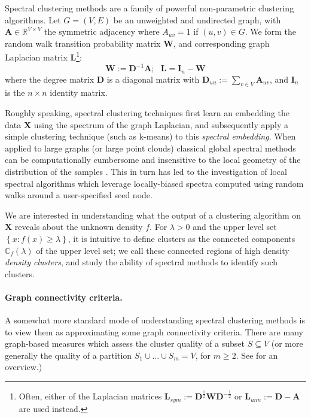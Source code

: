 \documentclass{article}
\newcommand{\set}[1]{\left\{#1\right\}}
\newcommand{\Reals}{\mathbb{R}}
\newcommand{\1}{\mathbf{1}}
\newcommand{\Abf}{\mathbf{A}}
\newcommand{\Xbf}{\mathbf{X}}
\newcommand{\Wbf}{\mathbf{W}}
\newcommand{\Lbf}{\mathbf{L}}
\newcommand{\Dbf}{\mathbf{D}}
\newcommand{\Ibf}[1]{\mathbf{I}_{#1}}
\theoremstyle{aldenthm}
\theoremstyle{aldenrmrk}
\begin{document}
Spectral clustering methods are a family of powerful non-parametric clustering algorithms. Let $G = (V,E)$ be an unweighted and undirected graph, with $\Abf \in \Reals^{V \times V}$ the symmetric adjacency where $A_{uv} = 1$ if $(u,v) \in G$. We form the random walk transition probability matrix $\Wbf$, and corresponding graph Laplacian matrix $\Lbf$\footnote{Often, either of the Laplacian matrices  $\Lbf_{sym} := \Dbf^{\frac{1}{2}}\Wbf \Dbf^{-\frac{1}{2}}$ or $\Lbf_{unn} := \Dbf - \Abf$ are used instead.}:
\begin{equation}
\label{eqn: random_walk_laplacian}
\Wbf := \Dbf^{-1}\Abf; ~~~ \Lbf = \Ibf{n} - \Wbf
\end{equation}
where the degree matrix $\Dbf$ is a diagonal matrix with $\Dbf_{uu} := \sum_{v \in V} \Abf_{uv}$, and $\Ibf{n}$ is the $n \times n$ identity matrix.

Roughly speaking, spectral clustering techniques first learn an embedding the data $\Xbf$ using the spectrum of the graph Laplacian, and subsequently 
apply a simple clustering technique (such as k-means) to this \emph{spectral embedding}.
When applied to large graphs (or large point clouds) classical global spectral 
methods can be computationally cumbersome and 
insensitive to the local geometry of the distribution of the samples
\citep{mahoney2012,leskovec2010}.
This in turn has led to the investigation of local spectral algorithms \citep{spielman2013,anderson2006,leskovec2010}
which leverage locally-biased spectra computed using random walks around 
a user-specified seed node. 

We are interested in understanding what the output of a clustering algorithm on $\Xbf$ reveals about the unknown density $f$. For $\lambda > 0$ and the upper level set $\set{x: f(x) \geq \lambda}$, it is intuitive \cite{hartigan1981,chaudhuri2010} to define clusters as the connected components $\mathbb{C}_f(\lambda)$ of the upper level set; we call these connected regions of high density \textit{density clusters}, and study the ability of spectral methods to identify such clusters. 

\paragraph{Graph connectivity criteria.}

A somewhat more standard mode of understanding spectral clustering methods is to view them as approximating some graph connectivity criteria. There are many graph-based measures which assess the cluster quality of a subset $S \subseteq V$ (or more generally the quality of a partition $S_1 \cup \ldots \cup S_m = V$, for $m \geq 2$. See \cite{yang2015,fortunato2010} for an overview.)
\end{document}

